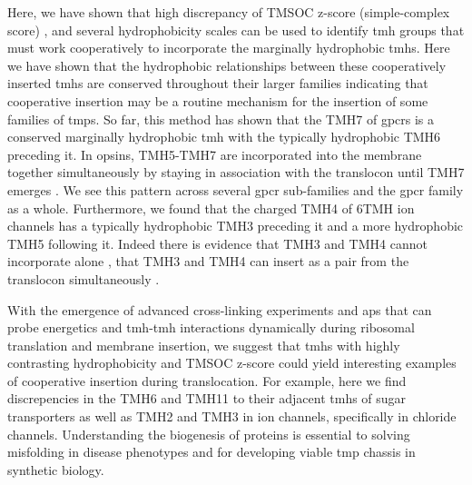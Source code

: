 Here, we have shown that high discrepancy of TMSOC z-score (simple-complex score) \cite{Wong2011, Wong2012}, and several hydrophobicity scales \cite{Hessa2005, Kyte1982, White1999, Eisenberg1984} can be used to identify \gls{tmh} groups that must work cooperatively to incorporate the marginally hydrophobic \gls{tmh}s.
Here we have shown that the hydrophobic relationships between these cooperatively inserted \gls{tmh}s are conserved throughout their larger families indicating that cooperative insertion may be a routine mechanism for the insertion of some families of \gls{tmp}s.
So far, this method has shown that the TMH7 of \gls{gpcr}s is a conserved marginally hydrophobic \gls{tmh} with the typically hydrophobic TMH6 preceding it.
In opsins, TMH5-TMH7 are incorporated into the membrane together simultaneously by staying in association with the translocon until TMH7 emerges \cite{Ismail2008}.
We see this pattern across several \gls{gpcr} sub\--families and the \gls{gpcr} family as a whole.
Furthermore, we found that the charged TMH4 of 6TMH ion channels has a typically hydrophobic TMH3 preceding it and a more hydrophobic TMH5 following it.
Indeed there is evidence that TMH3 and TMH4 cannot incorporate alone \cite{Sato2003}, that TMH3 and TMH4 can insert as a pair from the translocon simultaneously \cite{Zhang2007, Cymer2015}.

With the emergence of advanced cross\--linking experiments and \gls{ap}s that can probe energetics and \gls{tmh}\--\gls{tmh} interactions dynamically during ribosomal translation and membrane insertion, we suggest that \gls{tmh}s with highly contrasting hydrophobicity and TMSOC z-score could yield interesting examples of cooperative insertion during translocation.
For example, here we find discrepencies in the TMH6 and TMH11 to their adjacent \gls{tmh}s of sugar transporters as well as TMH2 and TMH3 in ion channels, specifically in chloride channels.
Understanding the biogenesis of proteins is essential to solving misfolding in disease phenotypes and for developing viable \gls{tmp} chassis in synthetic biology.
